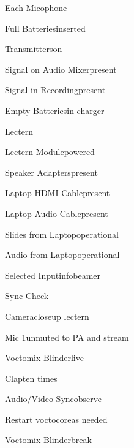 \begin{checklist}{Each Micophone}
  \item{Full Batteries}{inserted}
  \item{Transmitters}{on}
  \item{Signal on Audio Mixer}{present}
  \item{Signal in Recording}{present}
  \item{Empty Batteries}{in charger}
\end{checklist}

\begin{checklist}{Lectern}
  \item{Lectern Module}{powered}
  \item{Speaker Adapters}{present}
  \item{Laptop HDMI Cable}{present}
  \item{Laptop Audio Cable}{present}
  \item{Slides from Laptop}{operational}
  \item{Audio from Laptop}{operational}
  \item{Selected Input}{infobeamer}
\end{checklist}

\begin{checklist}{Sync Check}
  \item{Camera}{closeup lectern}
  \item{Mic 1}{unmuted to PA and stream}
  \item{Voctomix Blinder}{live}
  \item{Clap}{ten times}
  \item{Audio/Video Sync}{observe}
  \item{Restart voctocore}{as needed}
  \item{Voctomix Blinder}{break}

\end{checklist}


